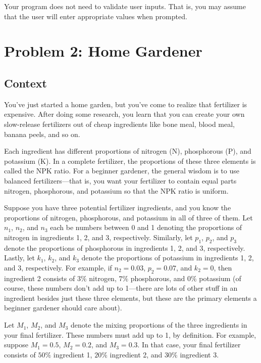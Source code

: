 \documentclass{article}
\begin{document}
Your program does not need to validate user inputs. That is, you may assume that the user will enter appropriate values when prompted.

\section{Problem 2: Home Gardener}

\subsection{Context}

You've just started a home garden, but you've come to realize that fertilizer is expensive. After doing some research, you learn that you can create your own slow-release fertilizers out of cheap ingredients like bone meal, blood meal, banana peels, and so on.

Each ingredient has different proportions of nitrogen (N), phosphorous (P), and potassium (K). In a complete fertilizer, the proportions of these three elements is called the NPK ratio. For a beginner gardener, the general wisdom is to use balanced fertilizers---that is, you want your fertilizer to contain equal parts nitrogen, phosphorous, and potassium so that the NPK ratio is uniform.

Suppose you have three potential fertilizer ingredients, and you know the proportions of nitrogen, phosphorous, and potassium in all of three of them. Let $n_1$, $n_2$, and $n_3$ each be numbers between 0 and 1 denoting the proportions of nitrogen in ingredients 1, 2, and 3, respectively. Similarly, let $p_1$, $p_2$, and $p_3$ denote the proportions of phosphorous in ingredients 1, 2, and 3, respectively. Lastly, let $k_1$, $k_2$, and $k_3$ denote the proportions of potassium in ingredients 1, 2, and 3, respectively. For example, if $n_2=0.03$, $p_2=0.07$, and $k_2=0$, then ingredient 2 consists of $3\%$ nitrogen, $7\%$ phosphorous, and $0\%$ potassium (of course, these numbers don't add up to 1---there are lots of other stuff in an ingredient besides just these three elements, but these are the primary elements a beginner gardener should care about).

Let $M_1$, $M_2$, and $M_3$ denote the mixing proportions of the three ingredients in your final fertilizer. These numbers must add up to 1, by definition. For example, suppose $M_1=0.5$, $M_2=0.2$, and $M_3=0.3$. In that case, your final fertilizer consists of $50\%$ ingredient 1, $20\%$ ingredient 2, and $30\%$ ingredient 3.
\end{document}
